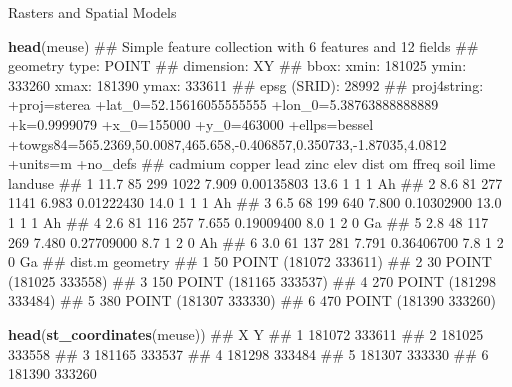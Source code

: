 \documentclass[11pt,ignorenonframetext,]{beamer}
\newenvironment{Shaded}{}{}
\newcommand{\KeywordTok}[1]{\textcolor[rgb]{0.00,0.44,0.13}{\textbf{#1}}}
\newcommand{\NormalTok}[1]{#1}
\let\oldShaded\Shaded
\let\endoldShaded\endShaded
\renewenvironment{Shaded}{\footnotesize\begin{spacing}{0.9}\oldShaded}{\endoldShaded\end{spacing}}
\let\oldverbatim\verbatim
\let\endoldverbatim\endverbatim
\newcommand{\scriptoutput}{
  \renewenvironment{Shaded}{\scriptsize\begin{spacing}{0.9}\oldShaded}{\endoldShaded\end{spacing}}
  \renewenvironment{verbatim}{\scriptsize\begin{spacing}{0.9}\oldverbatim}{\endoldverbatim\end{spacing}}
}
\begin{document}
\begin{frame}[fragile,t]{Rasters and Spatial Models}
\protect\hypertarget{rasters-and-spatial-models}{}

\scriptoutput

\begin{Shaded}
\begin{Highlighting}[]
\KeywordTok{head}\NormalTok{(meuse)}
\NormalTok{## Simple feature collection with 6 features and 12 fields}
\NormalTok{## geometry type:  POINT}
\NormalTok{## dimension:      XY}
\NormalTok{## bbox:           xmin: 181025 ymin: 333260 xmax: 181390 ymax: 333611}
\NormalTok{## epsg (SRID):    28992}
\NormalTok{## proj4string:    +proj=sterea +lat_0=52.15616055555555 +lon_0=5.38763888888889 +k=0.9999079 +x_0=155000 +y_0=463000 +ellps=bessel +towgs84=565.2369,50.0087,465.658,-0.406857,0.350733,-1.87035,4.0812 +units=m +no_defs}
\NormalTok{##   cadmium copper lead zinc  elev       dist   om ffreq soil lime landuse}
\NormalTok{## 1    11.7     85  299 1022 7.909 0.00135803 13.6     1    1    1      Ah}
\NormalTok{## 2     8.6     81  277 1141 6.983 0.01222430 14.0     1    1    1      Ah}
\NormalTok{## 3     6.5     68  199  640 7.800 0.10302900 13.0     1    1    1      Ah}
\NormalTok{## 4     2.6     81  116  257 7.655 0.19009400  8.0     1    2    0      Ga}
\NormalTok{## 5     2.8     48  117  269 7.480 0.27709000  8.7     1    2    0      Ah}
\NormalTok{## 6     3.0     61  137  281 7.791 0.36406700  7.8     1    2    0      Ga}
\NormalTok{##   dist.m              geometry}
\NormalTok{## 1     50 POINT (181072 333611)}
\NormalTok{## 2     30 POINT (181025 333558)}
\NormalTok{## 3    150 POINT (181165 333537)}
\NormalTok{## 4    270 POINT (181298 333484)}
\NormalTok{## 5    380 POINT (181307 333330)}
\NormalTok{## 6    470 POINT (181390 333260)}

\KeywordTok{head}\NormalTok{(}\KeywordTok{st_coordinates}\NormalTok{(meuse))}
\NormalTok{##        X      Y}
\NormalTok{## 1 181072 333611}
\NormalTok{## 2 181025 333558}
\NormalTok{## 3 181165 333537}
\NormalTok{## 4 181298 333484}
\NormalTok{## 5 181307 333330}
\NormalTok{## 6 181390 333260}
\end{Highlighting}
\end{Shaded}

\end{frame}
\end{document}
